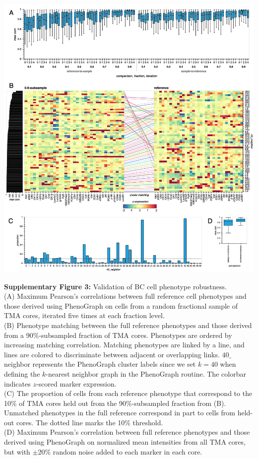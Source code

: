 \documentclass[preprint,review,3p,12pt]{elsarticle}
\begin{document}
\begin{suppfigure}[p]
\centering\includegraphics[width=\linewidth,
                 keepaspectratio]{suppfig3_secondrevision}
\caption{}
\label{fig:suppfig3}
\end{suppfigure}

\newpage

\noindent
\textbf{Supplementary Figure 3:} Validation of BC cell phenotype robustness.\\
(A) Maximum Pearson's correlations between full reference cell phenotypes and those derived using PhenoGraph on cells from a random fractional sample of TMA cores, iterated five times at each fraction level. \\
(B) Phenotype matching between the full reference phenotypes and those derived from a 90$\%$-subsampled fraction of TMA cores. Phenotypes are ordered by increasing matching correlation. Matching phenotypes are linked by a line, and lines are colored to discriminate between adjacent or overlapping links. $40\_$neighbor represents the PhenoGraph cluster labels since we set $k=40$ when defining the $k$-nearest neighbor graph in the PhenoGraph routine. The colorbar indicates $z$-scored marker expression.\\
(C) The proportion of cells from each reference phenotype that correspond to the 10$\%$ of TMA cores held out from the 90$\%$-subsampled fraction from (B). Unmatched phenotypes in the full reference correspond in part to cells from held-out cores. The dotted line marks the 10$\%$ threshold.\\
(D) Maximum Pearson's correlation between full reference phenotypes and those derived using PhenoGraph on normalized mean intensities from all TMA cores, but with $\pm$20$\%$ random noise added to each marker in each core.
\end{document}

